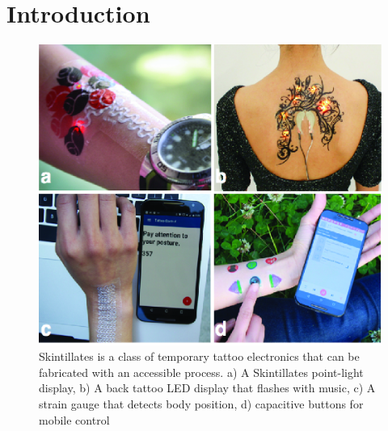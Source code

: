 \documentclass{sigchi}
\begin{document}
\section{Introduction}
\begin{figure}[!h]
\centering
\includegraphics[width=1\columnwidth]{figures/Figure1}
\caption{Skintillates is a class of temporary tattoo electronics that can be fabricated with an accessible process. a) A Skintillates point-light display, b) A back tattoo LED display that flashes with music, c) A strain gauge that detects body position, d) capacitive buttons for mobile control}
\vspace{-8pt}
\label{fig:overall}
\end{figure}
\end{document}
